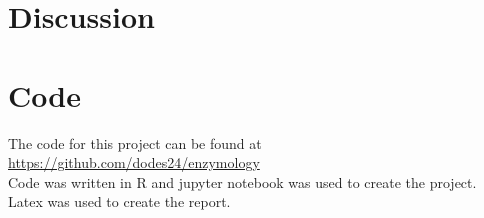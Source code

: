 \documentclass{article}
\begin{document}
\section{Discussion}

\section{Code}
The code for this project can be found at \url{https://github.com/dodes24/enzymology}\\
Code was written in R and jupyter notebook was used to create the project.
Latex was used to create the report.
\end{document}
